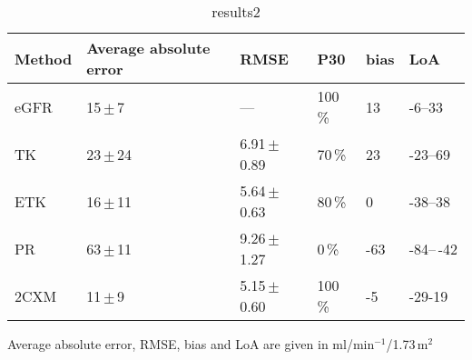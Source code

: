   
\begin{table}[H]
\centering
\caption{results2}
\label{tab:results2}
\begin{threeparttable}
\renewcommand{\arraystretch}{1.5}
\begin{tabular}{l R{2.5cm} R{2.5cm}  R{2cm} R{2cm} R{2cm}}
	\toprule

	\textbf{Method} & \textbf{Average absolute error}  & \textbf{RMSE}    & \textbf{P30}   & \textbf{bias} & \textbf{LoA} \\ \toprule
				eGFR  & 		15\,$\pm$\,7     		 	 & ---  				&	100\,\%      &  13  & -6--33 \\
				 TK   & 		23\,$\pm$\,24    			 & 6.91\,$\pm$\,0.89		        & 	70\,\%       & 23   &  -23--69 \\
				ETK   & 		16\,$\pm$\,11     			 & 5.64\,$\pm$\,0.63			        &	80\,\%       &0    & -38--38\\
				 PR   & 		63\,$\pm$\,11     			 & 9.26\,$\pm$\,1.27				        &	  0\,\%      & -63  & -84--\,-42\\
			    2CXM  & 		11\,$\pm$\,9     		     & 5.15\,$\pm$\,0.60				        &	  100\,\%      &  -5  & -29-19\\
				

  	\bottomrule

\end{tabular}
\begin{tablenotes}%
\footnotesize{}%
\item Average absolute error, RMSE, bias and LoA are given in ml/min$^{-1}$/1.73\,m$^2$
    \end{tablenotes}
	\end{threeparttable}
\end{table}
